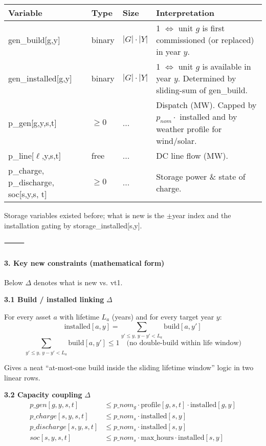 \begin{center}
\begin{tabular}{|l|l|l|l|}
\hline
Variable & Type & Size & Interpretation \\
\hline
gen\_build[g,y] & binary & $|G|\cdot|Y|$ & 1 $\Leftrightarrow$ unit $g$ is first commissioned (or replaced) in year $y$. \\
gen\_installed[g,y] & binary & $|G|\cdot|Y|$ & 1 $\Leftrightarrow$ unit $g$ is available in year $y$. Determined by sliding-sum of gen\_build. \\
p\_gen[g,y,s,t] & $\geq 0$ & ... & Dispatch (MW). Capped by $p_{nom} \cdot$ installed and by weather profile for wind/solar. \\
p\_line[$\ell$,y,s,t] & free & ... & DC line flow (MW). \\
p\_charge, p\_discharge, soc[s,y,s, t] & $\geq 0$ & ... & Storage power \& state of charge. \\
\hline
\end{tabular}
\end{center}

Storage variables existed before; what is new is the $\pm$year index and the installation gating by storage\_installed[s,y].

⸻

\paragraph{3. Key new constraints (mathematical form)}

Below $\Delta$ denotes what is new vs. vt1.

\textbf{3.1 Build / installed linking} $\Delta$

For every asset $a$ with lifetime $L_a$ (years) and for every target year $y$:
\[
\text{installed}[a,y]  = \sum_{y' \leq y,\, y - y' < L_a}   \text{build}[a,y']
\]
\[
\sum_{y' \leq y,\, y - y' < L_a}   \text{build}[a,y']  \leq 1 \quad \text{(no double-build within life window)}
\]

Gives a neat “at-most-one build inside the sliding lifetime window” logic in two linear rows.

\textbf{3.2 Capacity coupling} $\Delta$
\[
\begin{align*}
p\_gen[g,y,s,t] &\leq p\_nom_g \cdot \text{profile}[g,s,t] \cdot \text{installed}[g,y] \\
p\_charge[s,y,s,t]      &\leq p\_nom_s \cdot \text{installed}[s,y] \\
p\_discharge[s,y,s,t]   &\leq p\_nom_s \cdot \text{installed}[s,y] \\
soc[s,y,s,t]           &\leq p\_nom_s \cdot \text{max\_hours} \cdot \text{installed}[s,y]
\end{align*}
\]

